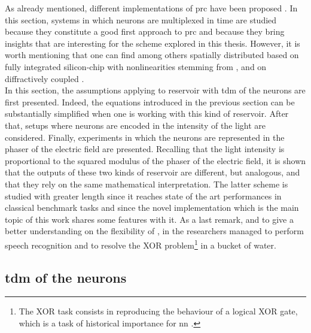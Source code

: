 \label{prc}

As already mentioned, different implementations of \gls{prc} have been proposed \cite{VanderSande2017}. In this section, systems in which neurons are multiplexed in time are studied because they constitute a good first approach to \gls{prc} and because they bring insights that are interesting for the scheme explored in this thesis. However, it is worth mentioning that one can find among others spatially distributed \rcer based on fully integrated silicon-chip with nonlinearities stemming from  \cite{Vandoorne2014}, and on diffractively coupled  \cite{Brunner2015}. \\

In this section, the assumptions applying to reservoir with \gls{tdm} of the neurons are first presented. Indeed, the equations introduced in the previous section can be substantially simplified when one is working with this kind of reservoir. After that, setups where neurons are encoded in the intensity of the light are considered. Finally, experiments in which the neurons are represented in the phaser of the electric field are presented. Recalling that the light intensity is proportional to the squared modulus of the phaser of the electric field, it is shown that the outputs of these two kinds of reservoir are different, but analogous, and that they rely on the same mathematical interpretation. The latter scheme is studied with greater length since it reaches state of the art performances in classical benchmark tasks and since the novel implementation which is the main topic of this work shares some features with it. As a last remark, and to give a better understanding on the flexibility of \rcer, in \cite{Fernando2003} the researchers managed to perform speech recognition and to resolve the XOR problem\footnote{The XOR task consists in reproducing the behaviour of a logical XOR gate, which is a task of historical importance for \gls{nn} \cite{minsky1969perceptrons}.} in a bucket of water.\\


\subsection{\acrlong{tdm} of the neurons}

